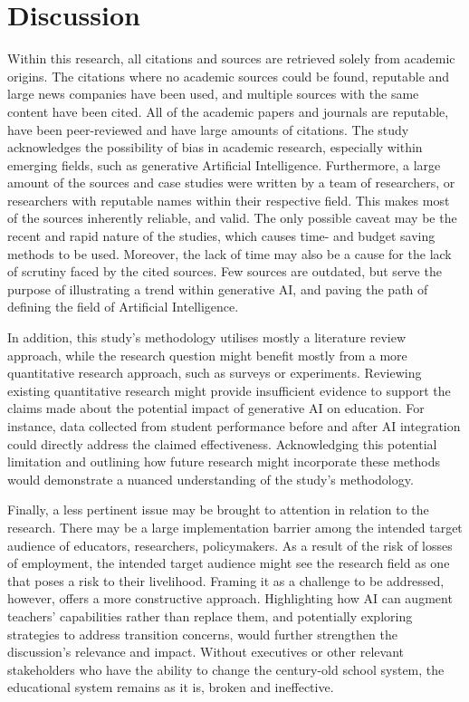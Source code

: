 \documentclass[a4paper,12pt]{report}
\begin{document}
\section{Discussion} \label{sect:discussion}
\hspace{10mm} Within this research, all citations and sources are retrieved solely from academic origins. The citations where no academic sources could be found, reputable and large news companies have been used, and multiple sources with the same content have been cited. All of the academic papers and journals are reputable, have been peer-reviewed and have large amounts of citations. The study acknowledges the possibility of bias in academic research, especially within emerging fields, such as generative Artificial Intelligence. Furthermore, a large amount of the sources and case studies were written by a team of researchers, or researchers with reputable names within their respective field. This makes most of the sources inherently reliable, and valid. The only possible caveat may be the recent and rapid nature of the studies, which causes time- and budget saving methods to be used. Moreover, the lack of time may also be a cause for the lack of scrutiny faced by the cited sources. Few sources are outdated, but serve the purpose of illustrating a trend within generative AI, and paving the path of defining the field of Artificial Intelligence.

In addition, this study's methodology utilises mostly a literature review approach, while the research question might benefit mostly from a more quantitative research approach, such as surveys or experiments. Reviewing existing quantitative research might provide insufficient evidence to support the claims made about the potential impact of generative AI on education. For instance, data collected from student performance before and after AI integration could directly address the claimed effectiveness. Acknowledging this potential limitation and outlining how future research might incorporate these methods would demonstrate a nuanced understanding of the study's methodology.

Finally, a less pertinent issue may be brought to attention in relation to the research. There may be a large implementation barrier among the intended target audience of educators, researchers, policymakers. As a result of the risk of losses of employment, the intended target audience might see the research field as one that poses a risk to their livelihood. Framing it as a challenge to be addressed, however, offers a more constructive approach. Highlighting how AI can augment teachers' capabilities rather than replace them, and potentially exploring strategies to address transition concerns, would further strengthen the discussion's relevance and impact. Without executives or other relevant stakeholders who have the ability to change the century-old school system, the educational system remains as it is, broken and ineffective.
\end{document}
